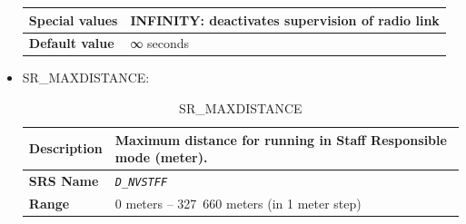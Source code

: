 \documentclass{template/openetcs}
\begin{document}
\begin{itemize}
\begin{longtable}{|l|l|}
				\hline
																																					
					\begin{minipage}[t]{0.22\linewidth} \textbf{Special values}	\end{minipage} 
				&	\begin{minipage}[t]{0.78\linewidth} INFINITY: deactivates supervision of radio link \end{minipage} \\	
						
				\hline
										
					\begin{minipage}[t]{0.22\linewidth} \textbf{Default value}	\end{minipage} 
				&	\begin{minipage}[t]{0.78\linewidth} ∞ seconds \end{minipage} \\
				
				\hline
				
			\end{longtable}
				
		\item SR\_MAXDISTANCE:
		
			\begin{longtable}{|l|l|}
				\caption{SR\_MAXDISTANCE}\\ 																													
				\hline
				
					\begin{minipage}[t]{0.22\linewidth} \textbf{Description}	\end{minipage} 
				&	\begin{minipage}[t]{0.78\linewidth} Maximum distance for running in Staff Responsible mode (meter). \end{minipage} \\
				
				\hline
				
					\begin{minipage}[t]{0.22\linewidth} \textbf{SRS Name}	\end{minipage} 
				&	\begin{minipage}[t]{0.78\linewidth} \emph{\texttt{D\_NVSTFF}} \end{minipage} \\
				
				\hline
																																
					\begin{minipage}[t]{0.22\linewidth} \textbf{Range}	\end{minipage} 
				&	\begin{minipage}[t]{0.78\linewidth} 0 meters – 327 660 meters (in 1 meter step) \end{minipage} \\
					

\end{longtable}
\end{itemize}
\end{document}
